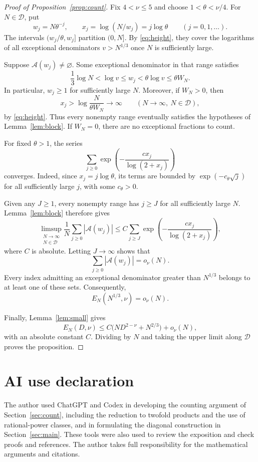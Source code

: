 \documentclass[11pt,reqno]{amsart}
\theoremstyle{definition}
\newcommand{\N}{\mathbb N}
\newcommand{\DD}{\mathcal D}
\begin{document}
\begin{proof}[Proof of Proposition~\ref{prop:count}]
Fix $4<\nu\le5$ and choose
$1<\theta<\nu/4$. For $N\in\DD$, put
\[
 w_j=N\theta^{-j},\qquad
 x_j=\log(N/w_j)=j\log\theta
 \qquad(j=0,1,\ldots).
\]
The intervals $(w_j/\theta,w_j]$ partition
$(0,N]$. By \eqref{eq:height}, they cover
the logarithms of all exceptional
denominators $v>N^{1/3}$ once $N$ is
sufficiently large.

Suppose $\mathcal A(w_j)\ne\varnothing$.
Some exceptional denominator in that range
satisfies
\[
 \frac13\log N<\log v\le w_j
 <\theta\log v\le\theta W_N.
\]
In particular, $w_j\ge1$ for sufficiently
large $N$. Moreover, if $W_N>0$, then
\[
 x_j>\log\frac{N}{\theta W_N}
 \longrightarrow\infty
 \qquad(N\to\infty,\ N\in\DD),
\]
by \eqref{eq:height}. Thus every nonempty
range eventually satisfies the hypotheses
of Lemma~\ref{lem:block}. If $W_N=0$,
there are no exceptional fractions to count.

For fixed $\theta>1$, the series
\[
 \sum_{j\ge0}
 \exp\left(-\frac{cx_j}{\log(2+x_j)}\right)
\]
converges. Indeed, since $x_j=j\log\theta$,
its terms are bounded by
$\exp(-c_\theta\sqrt j)$ for all sufficiently
large $j$, with some $c_\theta>0$.

Given any $J\ge1$, every nonempty range
has $j\ge J$ for all sufficiently large $N$.
Lemma~\ref{lem:block} therefore gives
\[
 \limsup_{\substack{N\to\infty\\N\in\DD}}
 \frac1N\sum_{j\ge0}|\mathcal A(w_j)|
 \le C\sum_{j\ge J}
 \exp\left(-\frac{cx_j}{\log(2+x_j)}\right),
\]
where $C$ is absolute. Letting $J\to\infty$
shows that
\[
 \sum_{j\ge0}|\mathcal A(w_j)|=o_\nu(N).
\]
Every index admitting an exceptional
denominator greater than $N^{1/3}$
belongs to at least one of these sets.
Consequently,
\[
 E_N(N^{1/3},\nu)=o_\nu(N).
\]

Finally, Lemma~\ref{lem:small} gives
\[
 E_N(D,\nu)
 \le C\bigl(ND^{2-\nu}+N^{2/3}\bigr)
 +o_\nu(N),
\]
with an absolute constant $C$.
Dividing by $N$ and taking the upper
limit along $\DD$ proves the proposition.
\end{proof}


\section*{AI use declaration}

The author used ChatGPT and Codex in developing the counting
argument of Section~\ref{sec:count}, including the reduction to twofold
products and the use of rational-power classes, and in
formulating the diagonal construction in Section~\ref{sec:main}.
These tools were also used to review the exposition and
check proofs and references. The author takes full
responsibility for the mathematical arguments and citations.
\end{document}
